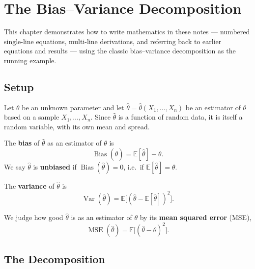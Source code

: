 \chapter{The Bias--Variance Decomposition}
\label{ch:biasvar}

This chapter demonstrates how to write mathematics in these notes ---
numbered single-line equations, multi-line derivations, and referring
back to earlier equations and results --- using the classic
bias--variance decomposition as the running example.

\section{Setup}

Let $\theta$ be an unknown parameter and let $\hat\theta = \hat\theta(X_1,\dots,X_n)$
be an estimator of $\theta$ based on a sample $X_1,\dots,X_n$. Since
$\hat\theta$ is a function of random data, it is itself a random variable,
with its own mean and spread.


\begin{definition}[Bias]
\label{def:bias}
The \textbf{bias} of $\hat\theta$ as an estimator of $\theta$ is
\begin{equation}
\label{eq:bias-def}
\operatorname{Bias}(\hat\theta) = \mathbb{E}[\hat\theta] - \theta.
\end{equation}
We say $\hat\theta$ is \textbf{unbiased} if $\operatorname{Bias}(\hat\theta) = 0$,
i.e.\ if $\mathbb{E}[\hat\theta] = \theta$.
\end{definition}

\begin{definition}[Variance]
\label{def:variance}
The \textbf{variance} of $\hat\theta$ is
\begin{equation}
\label{eq:var-def}
\operatorname{Var}(\hat\theta) = \mathbb{E}\big[(\hat\theta - \mathbb{E}[\hat\theta])^2\big].
\end{equation}
\end{definition}

We judge how good $\hat\theta$ is as an estimator of $\theta$ by its
\textbf{mean squared error} (MSE),
\begin{equation}
\label{eq:mse-def}
\operatorname{MSE}(\hat\theta) = \mathbb{E}\big[(\hat\theta - \theta)^2\big].
\end{equation}

\section{The Decomposition}


